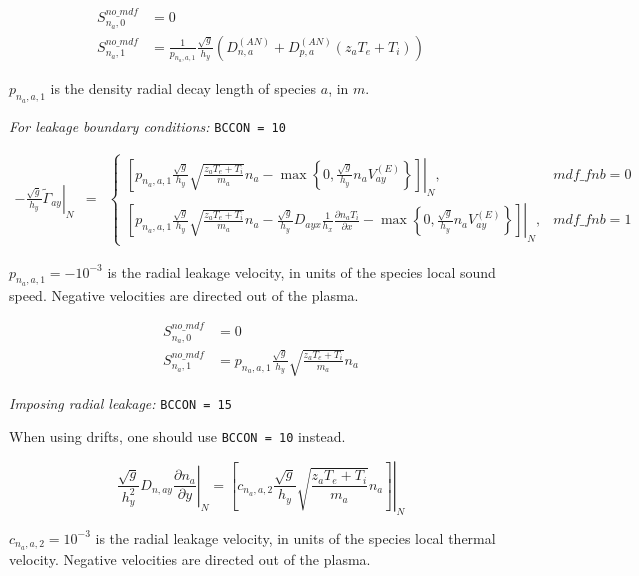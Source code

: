 \documentclass[a4paper,10pt]{report}
\begin{document}
\begin{align}
S^{no\_mdf}_{n_a,0} & = 0 \\
S^{no\_mdf}_{n_a,1} & = \frac{1}{p_{n_a,a,1}} \frac{\sqrt{g}}{h_y} \left( D^{(AN)}_{n,a} + D^{(AN)}_{p,a} \left( z_a T_e + T_i \right) \right)
\end{align}

$p_{n_a,a,1}$ is the density radial decay length of species $a$, in $m$.

{\em For leakage boundary conditions:} {\tt BCCON = 10}

\begin{equation}
\begin{matrix}
\left. -\frac{\sqrt g}{h_y} \widetilde{\Gamma}_{ay} \right|_{N}& =
& \left\{
\begin{matrix}
\left. \left[
	p_{n_a,a,1} \frac{\sqrt g}{h_y} \sqrt{\frac{z_a T_e + T_i}{m_a}} n_a
	-
	\max \left\{0, \frac{\sqrt g}{h_y} n_a V_{ay}^{(E)} \right\}
\right] \right|_{N}, & mdf\_fnb = 0
\\
\left. \left[
	p_{n_a,a,1} \frac{\sqrt g}{h_y} \sqrt{\frac{z_a T_e + T_i}{m_a}} n_a
	-
	\frac{\sqrt g}{h_y} D_{ayx} \frac1{h_x} \frac{\partial n_a T_i}{\partial x}
	-
	\max \left\{0, \frac{\sqrt g}{h_y} n_a V_{ay}^{(E)} \right\}
\right] \right|_{N}, & mdf\_fnb = 1
\end{matrix} \right.
\end{matrix}
\end{equation}

$p_{n_a,a,1} = -10^{-3}$ is the radial leakage velocity, in units of the species local sound speed. Negative velocities are directed out of the plasma.

\begin{align}
S^{no\_mdf}_{n_a,0} & = 0 \\
S^{no\_mdf}_{n_a,1} & = {p_{n_a,a,1}} \frac{\sqrt{g}}{h_y} \sqrt{\frac{z_a T_e + T_i}{m_a}} n_a
\end{align}

{\em Imposing radial leakage:} {\tt BCCON = 15}

When using drifts, one should use {\tt BCCON = 10} instead.

\begin{equation}
\left. \frac{\sqrt g}{h_y^2} D_{n,ay} \frac{\partial n_a}{\partial y} \right|_N
=
\left. \left[
c_{n_a,a,2} \frac{\sqrt g}{h_y} \sqrt{\frac{z_a T_e + T_i}{m_a}} n_a
\right] \right|_N
\end{equation}

$c_{n_a,a,2} = 10^{-3}$ is the radial leakage velocity, in units of the species local thermal velocity. Negative velocities are directed out of the plasma.
\end{document}
